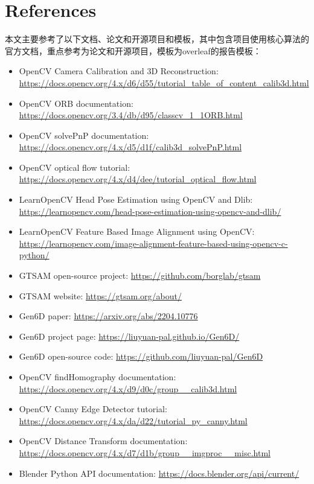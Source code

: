 \documentclass[lang=cn,11pt,a4paper]{elegantpaper}
\begin{document}
\section{References}

本文主要参考了以下文档、论文和开源项目和模板，其中包含项目使用核心算法的官方文档，重点参考为论文和开源项目，模板为overleaf的报告模板：
\begin{itemize}
  \item OpenCV Camera Calibration and 3D Reconstruction: \url{https://docs.opencv.org/4.x/d6/d55/tutorial_table_of_content_calib3d.html}
  \item OpenCV ORB documentation: \url{https://docs.opencv.org/3.4/db/d95/classcv_1_1ORB.html}
  \item OpenCV solvePnP documentation: \url{https://docs.opencv.org/4.x/d5/d1f/calib3d_solvePnP.html}
  \item OpenCV optical flow tutorial: \url{https://docs.opencv.org/4.x/d4/dee/tutorial_optical_flow.html}
  \item LearnOpenCV Head Pose Estimation using OpenCV and Dlib: \url{https://learnopencv.com/head-pose-estimation-using-opencv-and-dlib/}
  \item LearnOpenCV Feature Based Image Alignment using OpenCV: \url{https://learnopencv.com/image-alignment-feature-based-using-opencv-c-python/}
  \item GTSAM open-source project: \url{https://github.com/borglab/gtsam}
  \item GTSAM website: \url{https://gtsam.org/about/}
  \item Gen6D paper: \url{https://arxiv.org/abs/2204.10776}
  \item Gen6D project page: \url{https://liuyuan-pal.github.io/Gen6D/}
  \item Gen6D open-source code: \url{https://github.com/liuyuan-pal/Gen6D}
  \item OpenCV findHomography documentation: \url{https://docs.opencv.org/4.x/d9/d0c/group__calib3d.html}
  \item OpenCV Canny Edge Detector tutorial: \url{https://docs.opencv.org/4.x/da/d22/tutorial_py_canny.html}
  \item OpenCV Distance Transform documentation: \url{https://docs.opencv.org/4.x/d7/d1b/group__imgproc__misc.html}
  \item Blender Python API documentation: \url{https://docs.blender.org/api/current/}
\end{itemize}
\end{document}
